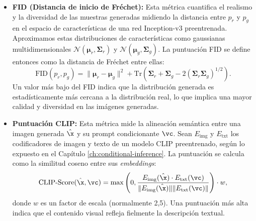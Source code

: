 \documentclass[../../book-main_es.tex]{subfiles}
\begin{document}
\begin{itemize}
    \item \textbf{FID (Distancia de inicio de Fréchet):} Esta métrica cuantifica el realismo y la 
          diversidad de las muestras generadas midiendo la distancia entre $p_r$ y $p_g$ en el 
          espacio de características de una red Inception-v3 preentrenada. Aproximamos estas 
          distribuciones de características como gaussianas multidimensionales 
          $\mathcal{N}(\bm{\mu}_r, \bm{\Sigma}_r)$ y $\mathcal{N}(\bm{\mu}_g, \bm{\Sigma}_g)$. 
          La puntuación FID se define entonces como la distancia de Fréchet entre ellas:
          \begin{equation}
              \text{FID}(p_r, p_g) = \| \bm{\mu}_r - \bm{\mu}_g \|^2 + \text{Tr}\left( \bm{\Sigma}_r + \bm{\Sigma}_g - 2(\bm{\Sigma}_r \bm{\Sigma}_g)^{1/2} \right).
          \end{equation}
          Un valor más bajo del FID indica que la distribución generada es estadísticamente más cercana 
          a la distribución real, lo que implica una mayor calidad 
          y diversidad en las imágenes generadas.

    \item \textbf{Puntuación CLIP:} Esta métrica mide la alineación semántica entre una imagen 
          generada $\hat{\x}$ y su prompt condicionante $\vc$. Sean $E_{\text{img}}$ y $E_{\text{txt}}$ 
          los codificadores de imagen y texto de un modelo CLIP preentrenado, según lo expuesto en el 
          Capítulo \ref{ch:conditional-inference}. La puntuación se calcula como la similitud coseno 
          entre sus \textit{embeddings}:
          \begin{equation}
              \text{CLIP-Score}(\hat{\x}, \vc) = \max \left( 0, \frac{E_{\text{img}}(\hat{\x}) \cdot E_{\text{txt}}(\vc)}{\|E_{\text{img}}(\hat{\x})\| \|E_{\text{txt}}(\vc)\|} \right) \cdot w,
          \end{equation}
          donde $w$ es un factor de escala (normalmente 2,5). Una puntuación más alta indica que el 
          contenido visual refleja fielmente la descripción textual.
\end{itemize}
\end{document}
